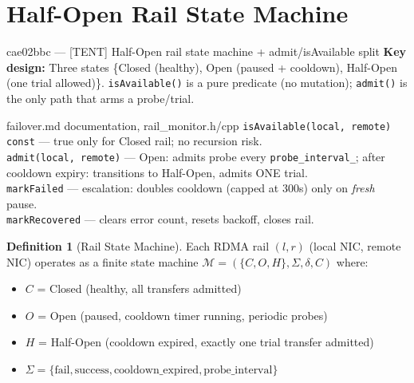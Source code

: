 \documentclass[11pt,a4paper,twoside]{article}
\theoremstyle{plain}
\theoremstyle{definition}
\newtheorem{definition}[theorem]{Definition}
\theoremstyle{remark}
\begin{document}
\section{Half-Open Rail State Machine}
\label{sec:rail-fsm}

\begin{commitbox}{cae02bbc --- [TENT] Half-Open rail state machine +
admit/isAvailable split}
\textbf{Key design:} Three states \{Closed (healthy), Open (paused + cooldown),
Half-Open (one trial allowed)\}. \texttt{isAvailable()} is a pure predicate (no mutation);
\texttt{admit()} is the only path that arms a probe/trial.
\end{commitbox}

\begin{codeline}{failover.md documentation, rail\_monitor.h/cpp}
\texttt{isAvailable(local, remote) const} --- true only for Closed rail; no recursion risk.\\
\texttt{admit(local, remote)} --- Open: admits probe every \texttt{probe\_interval\_};
after cooldown expiry: transitions to Half-Open, admits ONE trial.\\
\texttt{markFailed} --- escalation: doubles cooldown (capped at 300s) only on \textit{fresh} pause.\\
\texttt{markRecovered} --- clears error count, resets backoff, closes rail.
\end{codeline}

\begin{definition}[Rail State Machine]
\label{def:rail-fsm}
Each RDMA rail $(l, r)$ (local NIC, remote NIC) operates as a finite state machine
$\mathcal{M} = (\{C, O, H\}, \Sigma, \delta, C)$ where:
\begin{itemize}[nosep]
  \item $C$ = Closed (healthy, all transfers admitted)
  \item $O$ = Open (paused, cooldown timer running, periodic probes)
  \item $H$ = Half-Open (cooldown expired, exactly one trial transfer admitted)
  \item $\Sigma = \{\text{fail}, \text{success}, \text{cooldown\_expired}, \text{probe\_interval}\}$
\end{itemize}
\end{definition}
\end{document}
